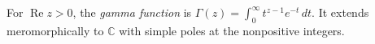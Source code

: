 
For $\operatorname{Re}z>0$, the \emph{gamma function} is $\Gamma(z)=\int_0^\infty t^{z-1}e^{-t}\,dt$. It extends meromorphically to $\mathbb C$ with simple poles at the nonpositive integers.
